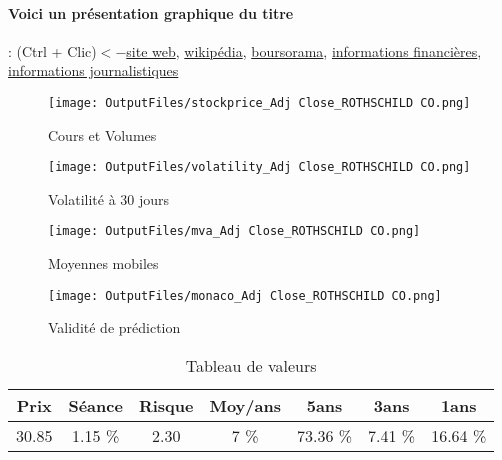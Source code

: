\documentclass[11pt,a4paper]{report}%
\begin{document}
\paragraph{Voici un présentation graphique du titre} : (Ctrl + Clic)$<-$\href{https://www.rothschildandco.com/fr/relations-investisseurs/}{site web}, \href{https://fr.wikipedia.org/wiki/Rothschild_%26_Co}{wikipédia}, \href{https://www.boursorama.com/cours/1rPROTH}{boursorama}, \href{https://www.qwant.com/?q=site:https:%2f%2fwww.easybourse.com%2faction-societe%2fROTHSCHILD-CO&t=web&client=ext-firefox-hp}{informations financières}, \href{https://bourse.lerevenu.com/cours-de-bourse/fiche-valeur-synthese/ROTHSCHILD-CO/ROTH-FR}{informations journalistiques}
\begin{figure}[!htb]
   \begin{minipage}{0.5\textwidth}
     \centering
     \texttt{[image: OutputFiles/stockprice\_Adj Close\_ROTHSCHILD CO.png]}
     \caption{Cours et Volumes}\label{Fig:price_ROTHSCHILD CO}
   \end{minipage}\hfill
   \begin{minipage}{0.5\textwidth}
     \centering
     \texttt{[image: OutputFiles/volatility\_Adj Close\_ROTHSCHILD CO.png]}
     \caption{Volatilité à 30 jours}\label{Fig:volat_ROTHSCHILD CO}
   \end{minipage}
\end{figure}
\begin{figure}[!htb]
   \begin{minipage}{0.5\textwidth}
     \centering
     \texttt{[image: OutputFiles/mva\_Adj Close\_ROTHSCHILD CO.png]}
     \caption{Moyennes mobiles}\label{Fig:mva_ROTHSCHILD CO}
   \end{minipage}\hfill
   \begin{minipage}{0.5\textwidth}
     \centering
     \texttt{[image: OutputFiles/monaco\_Adj Close\_ROTHSCHILD CO.png]}
     \caption{Validité de prédiction}\label{Fig:prediction_ROTHSCHILD CO}
   \end{minipage}
\end{figure}

\begin{table}[H]
  \centering
    \begin{tabular}{|c|c|c|c|c|c|c|}
    \hline
    Prix & Séance & Risque  & Moy/ans & 5ans & 3ans & 1ans \\
    \hline
    30.85 &    1.15 \%    & 2.30 & 7 \% & 73.36 \% & 7.41 \% & 16.64 \% \\
    \hline
    \end{tabular}%
        \label{tab:table_ROTHSCHILD CO}%
      \caption{Tableau de valeurs}
\end{table}%
\end{document}
